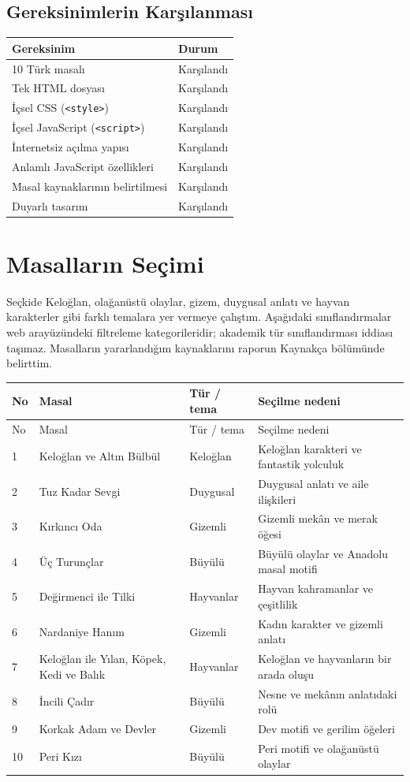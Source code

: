 \documentclass[10pt,a4paper]{article}
\begin{document}
\subsection{Gereksinimlerin Karşılanması}
\par\medskip\noindent\begin{tabularx}{\textwidth}{@{}Xl@{}}\toprule Gereksinim & Durum \\ \midrule
10 Türk masalı & Karşılandı \\
Tek HTML dosyası & Karşılandı \\
İçsel CSS (\texttt{<style>}) & Karşılandı \\
İçsel JavaScript (\texttt{<script>}) & Karşılandı \\
İnternetsiz açılma yapısı & Karşılandı \\
Anlamlı JavaScript özellikleri & Karşılandı \\
Masal kaynaklarının belirtilmesi & Karşılandı \\
Duyarlı tasarım & Karşılandı \\
\bottomrule\end{tabularx}
\section{Masalların Seçimi}
Seçkide Keloğlan, olağanüstü olaylar, gizem, duygusal anlatı ve hayvan karakterler gibi farklı temalara yer vermeye çalıştım. Aşağıdaki sınıflandırmalar web arayüzündeki filtreleme kategorileridir; akademik tür sınıflandırması iddiası taşımaz. Masalların yararlandığım kaynaklarını raporun Kaynakça bölümünde belirttim.
\small\begin{longtable}{@{}p{}p{}p{}p{}@{}}\toprule No & Masal & Tür / tema & Seçilme nedeni \\ \midrule\endfirsthead\toprule No & Masal & Tür / tema & Seçilme nedeni \\ \midrule\endhead
1 & Keloğlan ve Altın Bülbül & Keloğlan & Keloğlan karakteri ve fantastik yolculuk \\ 
2 & Tuz Kadar Sevgi & Duygusal & Duygusal anlatı ve aile ilişkileri \\ 
3 & Kırkıncı Oda & Gizemli & Gizemli mekân ve merak öğesi \\ 
4 & Üç Turunçlar & Büyülü & Büyülü olaylar ve Anadolu masal motifi \\ 
5 & Değirmenci ile Tilki & Hayvanlar & Hayvan kahramanlar ve çeşitlilik \\ 
6 & Nardaniye Hanım & Gizemli & Kadın karakter ve gizemli anlatı \\ 
7 & Keloğlan ile Yılan, Köpek, Kedi ve Balık & Hayvanlar & Keloğlan ve hayvanların bir arada oluşu \\ 
8 & İncili Çadır & Büyülü & Nesne ve mekânın anlatıdaki rolü \\ 
9 & Korkak Adam ve Devler & Gizemli & Dev motifi ve gerilim öğeleri \\ 
10 & Peri Kızı & Büyülü & Peri motifi ve olağanüstü olaylar \\ 
\bottomrule\end{longtable}\normalsize
\end{document}
